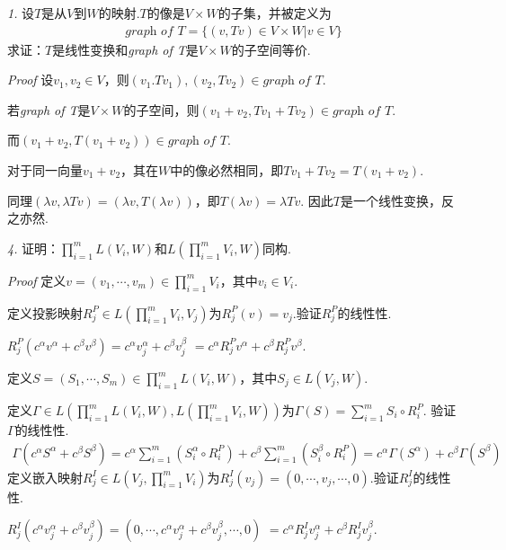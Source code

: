 \textit{1.}
设\(T\)是从\(V\)到\(W\)的映射.\(T\)的像是\(V \times W\)的子集，并被定义为
    \begin{align*}
        \textit{graph of T}= \{(v,Tv) \in V \times W |v \in V\}
    \end{align*}
求证：\(T\)是线性变换和\textit{graph of T}是\(V \times W\)的子空间等价.

\textit{Proof}
设\(v_1,v_2 \in V\)，则\((v_1.Tv_1),(v_2,Tv_2) \in \textit{graph of T}\).

若\textit{graph of T}是\(V \times W\)的子空间，则\((v_1+v_2,Tv_1+Tv_2) \in \textit{graph of T}\).

而\((v_1+v_2,T(v_1+v_2)) \in \textit{graph of T}\).

对于同一向量\(v_1+v_2\)，其在\(W\)中的像必然相同，即\(Tv_1+Tv_2=T(v_1+v_2)\).

同理\((\lambda v,\lambda Tv)=(\lambda v,T(\lambda v))\)，即\(T(\lambda v)=\lambda Tv\).
因此\(T\)是一个线性变换，反之亦然.

\hspace*{\fill}

\textit{4.}
证明：\(\prod_{i=1}^m L(V_i,W)\)和\(L(\prod_{i=1}^m V_i,W)\)同构.

\textit{Proof}
定义\(v=(v_1,\cdots,v_m) \in \prod_{i=1}^m V_i\)，其中\(v_i \in V_i\).

定义投影映射\(R_j^P \in L(\prod_{i=1}^m V_i,V_j)\)为\(R_j^P(v)=v_j\).验证\(R_j^P\)的线性性.

\(R_j^P(c^\alpha v^\alpha+c^\beta v^\beta)=c^\alpha v_j^\alpha+c^\beta v_j^\beta\)
\(=c^\alpha R_j^P v^\alpha+c^\beta R_j^P v^\beta\).

定义\(S=(S_1,\cdots,S_m) \in \prod_{i=1}^m L(V_i,W)\)，其中\(S_j \in L(V_j,W)\).

定义\(\Gamma \in L(\prod_{i=1}^m L(V_i,W),L(\prod_{i=1}^m V_i,W))\)为\(\Gamma(S)=\sum_{i=1}^m S_i \circ R_i^P\).
验证\(\Gamma\)的线性性.
    \begin{align*}
        \Gamma(c^\alpha S^\alpha+c^\beta S^\beta)
        =c^\alpha \sum_{i=1}^m(S_i^\alpha \circ R_i^P)+c^\beta \sum_{i=1}^m(S_i^\beta \circ R_i^P)
        =c^\alpha \Gamma(S^\alpha)+c^\beta \Gamma(S^\beta)
    \end{align*}
定义嵌入映射\(R_j^I \in L(V_j,\prod_{i=1}^m V_i)\)为\(R_j^I(v_j)=(0,\cdots,v_j,\cdots,0)\).验证\(R_j^I\)的线性性.

\(R_j^I(c^\alpha v_j^\alpha+c^\beta v_j^\beta)=(0,\cdots,c^\alpha v_j^\alpha+c^\beta v_j^\beta,\cdots,0)\)
\(=c^\alpha R_j^I v_j^\alpha+c^\beta R_j^I v_j^\beta\).

